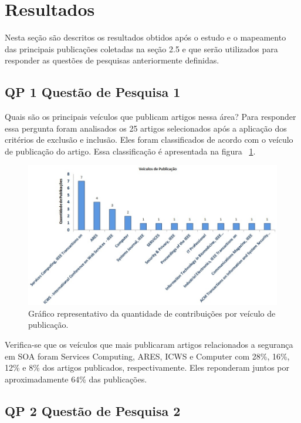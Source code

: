 \section{Resultados}
Nesta seção são descritos os resultados obtidos após o estudo e o mapeamento das principais publicações coletadas na seção 2.5 e que serão utilizados para responder as questões de pesquisas anteriormente definidas.

\subsection{QP 1 \- Questão de Pesquisa 1}

Quais são os principais veículos que publicam artigos nessa área?
Para responder essa pergunta foram analisados os 25 artigos selecionados após a aplicação dos critérios de exclusão e inclusão. Eles foram classificados de acordo com o veículo de publicação do artigo. Essa classificação é apresentada na figura ~\ref{fig:grafico_qtd_veiculo}.

\begin{figure}[!htb]
\centering
\includegraphics[scale=0.6]{qtd_veiculo_publicacao.jpg}
\caption{Gráfico representativo da quantidade de contribuições por veículo de publicação.}
\label{fig:grafico_qtd_veiculo}
\end{figure}

Verifica-se que os veículos que mais publicaram artigos relacionados a segurança em SOA foram Services Computing, ARES, ICWS e Computer com 28\%, 16\%, 12\% e 8\% dos artigos publicados, respectivamente. Eles reponderam juntos por aproximadamente 64\% das publicações.

\subsection{QP 2 \- Questão de Pesquisa 2}

